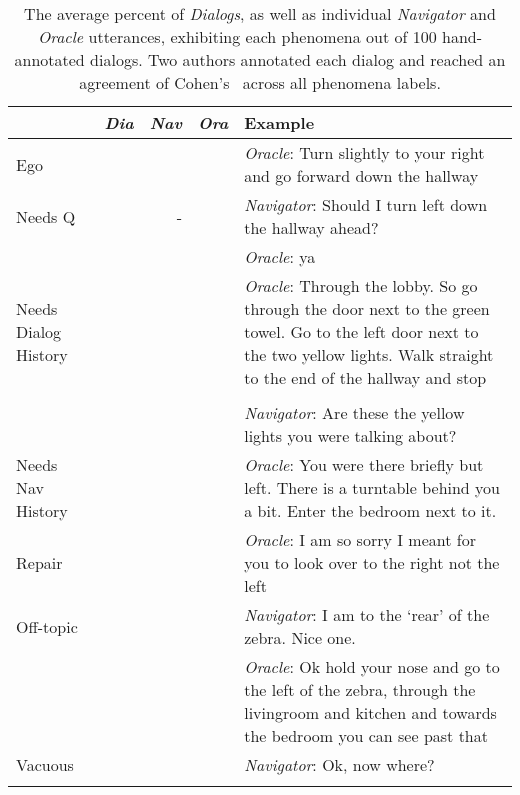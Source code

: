 \documentclass{article}
\newcommand{\nav}{\textit{Navigator}}
\newcommand{\ora}{\textit{Oracle}}
\begin{document}
\begin{table}[ht]
\centering
\begin{small}
\begin{tabular}{p{1.4cm}rrrp{8.5cm}}
    & \textbf{\textit{Dia}} & \textbf{\textit{Nav}} & \textbf{\textit{Ora}} & \textbf{Example} \\
    \toprule
    Ego &  &  &  & \ora{}: Turn slightly to {\color{blue}your right} and go {\color{blue}forward} down the hallway \\
    \cmidrule{5-5}
    Needs Q &  & - &  & \nav{}: Should I turn left down the hallway ahead? \\
    & & & &  \ora{}: {\color{blue}ya} \\
    \cmidrule{5-5}
    Needs Dialog History &  &  &  & \ora{}: Through the lobby. So go through the door next to the green towel. Go to the left door next to {\color{blue}the two yellow lights}. Walk straight to the end of the hallway and stop \\
    & & & &  \\
    & & & & \nav{}: Are these {\color{blue}the yellow lights} you were talking about? \\
    \cmidrule{5-5}
    Needs Nav History &  &  &  & \ora{}: {\color{blue}You were there briefly but left}. There is a turntable behind you a bit. Enter the bedroom next to it. \\
    \cmidrule{5-5}
    Repair &  &  &  & \ora{}: I am so sorry {\color{blue}I meant for you to look over to the right not the left} \\
    \cmidrule{5-5}
    Off-topic &  &  &  & \nav{}: I am to the `rear' of the zebra. {\color{blue}Nice one.} \\
    & & & & \ora{}: {\color{blue}Ok hold your nose} and go to the left of the zebra, through the livingroom and kitchen and towards the bedroom you can see past that \\
    \cmidrule{5-5}
    Vacuous &  &  &  & \nav{}: {\color{blue}Ok, now where?} \\
    \bottomrule \\
\end{tabular}
\end{small}
\caption{
The average percent of \textit{Dialogs}, as well as individual \nav{} and \ora{} utterances, exhibiting each phenomena out of 100 hand-annotated dialogs.
Two authors annotated each dialog and reached an agreement of Cohen's~ across all phenomena labels.
}
\vspace{-8mm}
\label{tab:analysis}
\end{table}
\end{document}
